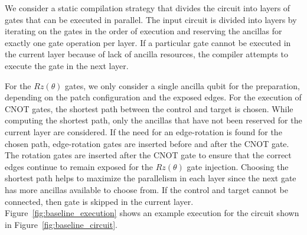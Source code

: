 We consider a static compilation strategy that divides the circuit into layers of gates that can be executed in parallel. The input circuit is divided into layers by iterating on the gates in the order of execution and reserving the ancillas for exactly one gate operation per layer. If a particular gate cannot be executed in the current layer because of lack of ancilla resources, the compiler attempts to execute the gate in the next layer.\par
For the $Rz(\theta)$ gates, we only consider a single ancilla qubit for the preparation, depending on the patch configuration and the exposed edges. For the execution of CNOT gates, the shortest path between the control and target is chosen. While computing the shortest path, only the ancillas that have not been reserved for the current layer are considered. If the need for an edge-rotation is found for the chosen path, edge-rotation gates are inserted before and after the CNOT gate. The rotation gates are inserted after the CNOT gate to ensure that the correct edges continue to remain exposed for the $Rz(\theta)$ gate injection. Choosing the shortest path helps to maximize the parallelism in each layer since the next gate has more ancillas available to choose from. If the control and target cannot be connected, then gate is skipped in the current layer. Figure~\ref{fig:baseline_execution} shows an example execution for the circuit shown in Figure~\ref{fig:baseline_circuit}.

